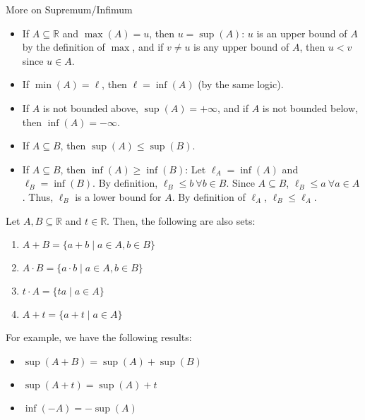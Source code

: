 \documentclass[10pt]{extarticle}
\newcommand{\R}{\mathbb{R}}
\begin{document}
  \begin{problem}{More on Supremum/Infimum}
    \begin{itemize}
      \item If $A \subseteq \R$ and $\max(A) = u$, then $u = \sup(A)$: $u$ is an upper bound of $A$ by the definition of $\max$, and if $v\neq u$ is any upper bound of $A$, then $u < v$ since $u\in A$.
      \item If $\min(A) = \ell$, then $\ell = \inf(A)$ (by the same logic).
      \item If $A$ is not bounded above, $\sup(A) = +\infty$, and if $A$ is not bounded below, then $\inf(A) = -\infty$.
      \item If $A\subseteq B$, then $\sup(A) \leq \sup(B)$.
      \item If $A\subseteq B$, then $\inf(A) \geq \inf(B)$: Let $\ell_A = \inf(A)$ and $\ell_B = \inf(B)$. By definition, $\ell_B \leq b~\forall b\in B$. Since $A\subseteq B$, $\ell_B \leq a~\forall a\in A$. Thus, $\ell_B$ is a lower bound for $A$. By definition of $\ell_A$, $\ell_B \leq \ell_A$.
    \end{itemize}
    Let $A,B\subseteq \R$ and $t\in\R$. Then, the following are also sets:
    \begin{enumerate}[(1)]
      \item $A + B = \{a+b\mid a\in A,b\in B\}$
      \item $A\cdot B = \{a\cdot b\mid a\in A,b\in B\}$
      \item $t\cdot A = \{ta\mid a\in A\}$
      \item $A + t = \{a+t\mid a\in A\}$
    \end{enumerate}
    For example, we have the following results:
    \begin{itemize}
      \item $\sup(A+B) = \sup(A) + \sup(B)$
      \item $\sup(A+t) = \sup(A) + t$
      \item $\inf(-A) = -\sup(A)$
    \end{itemize}
  \end{problem}
\end{document}
